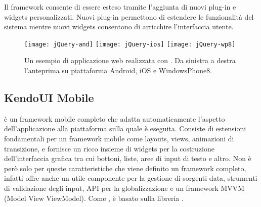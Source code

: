             Il frame\-work consente di essere esteso tramite l'aggiunta di nuovi
            plug-in e widgets personalizzati. Nuovi plug-in permettono di
            estendere le funzionalità del sistema mentre nuovi widgets
            consentono di arricchire l'interfaccia utente.
            \begin{figure}[h]
                \centering
                \texttt{[image: jQuery-and]}
                \texttt{[image: jQuery-ios]}
                \texttt{[image: jQuery-wp8]}
                \caption{
                    Un esempio di applicazione web realizzata con \jqm{}.
                    Da sinistra a destra l'anteprima su piattaforma Android, iOS
                    e WindowsPhone8.
                }
                \label{fig:jquery}
            \end{figure}

        \subsection{KendoUI Mobile}
        \label{subsec:kendo}
            \kendomob{} è un frame\-work mobile completo che adatta
            automaticamente l'aspetto dell'applicazione alla piattaforma sulla
            quale è eseguita. Consiste di estensioni fondamentali per un
            frame\-work mobile come layouts, views, animazioni di transizione,
            e fornisce un ricco insieme di widgets per la costruzione
            dell'interfaccia grafica tra cui bottoni, liste, aree di input di
            testo e altro. Non è però solo per queste caratteristiche che viene
            definito un frame\-work completo, infatti \kendomob{} offre anche
            un utile componente per la gestione di sorgenti data, strumenti di
            validazione degli input, API per la globalizzazione e un frame\-work
            MVVM (Model View ViewModel). Come \jqm{}, \kendomob{} è
            basato sulla libreria \js{} \jq{}.

